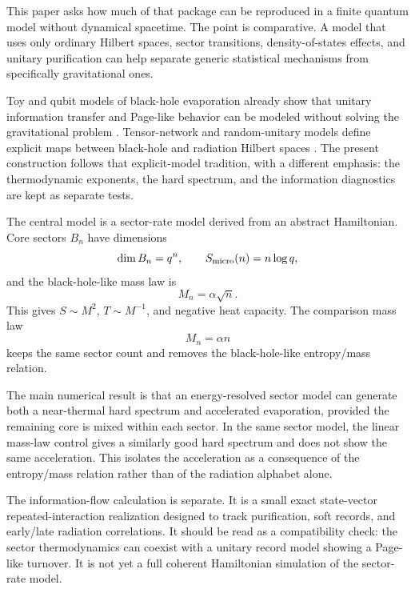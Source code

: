 \documentclass[aps,prd,onecolumn,longbibliography,nofootinbib]{revtex4-2}
\newcommand{\Smicro}{S_{\rm micro}}
\begin{document}
This paper asks how much of that package can be reproduced in a finite quantum
model without dynamical spacetime.  The point is comparative.  A model that
uses only ordinary Hilbert spaces, sector transitions, density-of-states
effects, and unitary purification can help separate generic statistical
mechanisms from specifically gravitational ones.

Toy and qubit models of black-hole evaporation already show that unitary
information transfer and Page-like behavior can be modeled without solving the
gravitational problem \cite{Avery2013,OsugaPage2018,Broda2021}.  Tensor-network
and random-unitary models define explicit maps between black-hole and radiation
Hilbert spaces \cite{LeutheusserVanRaamsdonk2017,PiroliSunderhaufQi2020}.  The
present construction follows that explicit-model tradition, with a different
emphasis: the thermodynamic exponents, the hard spectrum, and the information
diagnostics are kept as separate tests.

The central model is a sector-rate model derived from an abstract Hamiltonian.
Core sectors $B_n$ have dimensions
\begin{equation}
    \dim B_n=q^n,\qquad \Smicro(n)=n\log q,
\end{equation}
and the black-hole-like mass law is
\begin{equation}
    M_n=\alpha\sqrt n .
\end{equation}
This gives $S\sim M^2$, $T\sim M^{-1}$, and negative heat capacity.  The
comparison mass law
\begin{equation}
    M_n=\alpha n
\end{equation}
keeps the same sector count and removes the black-hole-like entropy/mass
relation.

The main numerical result is that an energy-resolved sector model can generate
both a near-thermal hard spectrum and accelerated evaporation, provided the
remaining core is mixed within each sector.  In the same sector model, the
linear mass-law control gives a similarly good hard spectrum and does not show
the same acceleration.  This isolates the acceleration as a consequence of the
entropy/mass relation rather than of the radiation alphabet alone.

The information-flow calculation is separate.  It is a small exact
state-vector repeated-interaction realization designed to track purification,
soft records, and early/late radiation correlations.  It should be read as a
compatibility check: the sector thermodynamics can coexist with a unitary
record model showing a Page-like turnover.  It is not yet a full coherent
Hamiltonian simulation of the sector-rate model.
\end{document}
